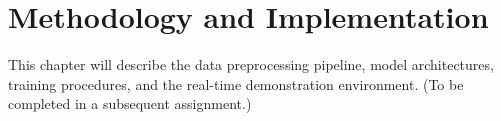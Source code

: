 \chapter{Methodology and Implementation}
\label{chap:methodology}

\par This chapter will describe the data preprocessing pipeline, model architectures, training procedures, and the real-time demonstration environment. (To be completed in a subsequent assignment.)
